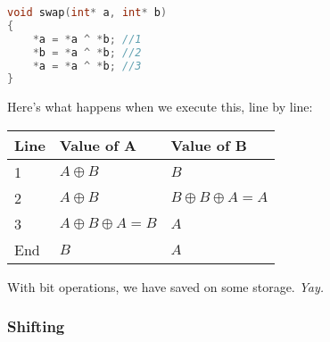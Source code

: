 \documentclass{article}
\newcommand{\ms}[1]{\texttt{#1}}
\begin{document}
\begin{center}
\centering
\begin{lstlisting}[language=C]
void swap(int* a, int* b)
{
	*a = *a ^ *b; //1
	*b = *a ^ *b; //2
	*a = *a ^ *b; //3
}
\end{lstlisting}
\end{center}
Here's what happens when we execute this, line by line:\\
\begin{center}
\begin{table}[ht!]
\centering
\begin{tabular}{|l|l|l|}
\hline
Line & Value of A                     & Value of B                     \\ \hline
1    & \ms{$A \oplus B$}              & \ms{$B$}                       \\ \hline
2    & \ms{$A \oplus B$}              & \ms{$B \oplus B \oplus A = A$} \\ \hline
3    & \ms{$A \oplus B \oplus A = B$} & \ms{$A$}                       \\ \hline
End  & \ms{$B$}                         & \ms{$A$}                         \\ \hline
\end{tabular}
\end{table}
\end{center}
With bit operations, we have saved on some storage. \textit{Yay.}
\subsubsection{Shifting}
\end{document}
